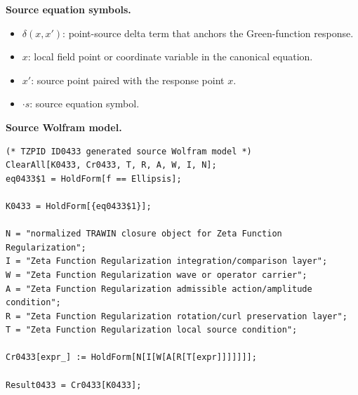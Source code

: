 \begin{minipage}[t]{0.49\linewidth}
\begingroup
\small
\raggedright
\textbf{Source equation symbols.}\par
\begin{itemize}[leftmargin=1.35em,itemsep=1pt,topsep=1pt,parsep=0pt]
    \item $\delta(x,x')$: point-source delta term that anchors the Green-function response.
    \item $x$: local field point or coordinate variable in the canonical equation.
    \item $x'$: source point paired with the response point $x$.
    \item $\cdot s$: source equation symbol.
\end{itemize}
\endgroup
\end{minipage}\hfill
\begin{minipage}[t]{0.47\linewidth}
\begingroup
\scriptsize
\raggedright
\textbf{Source Wolfram model.}\par
\begin{Verbatim}[fontsize=\tiny,breaklines=true,breakanywhere=true]
(* TZPID ID0433 generated source Wolfram model *)
ClearAll[K0433, Cr0433, T, R, A, W, I, N];
eq0433$1 = HoldForm[f == Ellipsis];

K0433 = HoldForm[{eq0433$1}];

N = "normalized TRAWIN closure object for Zeta Function Regularization";
I = "Zeta Function Regularization integration/comparison layer";
W = "Zeta Function Regularization wave or operator carrier";
A = "Zeta Function Regularization admissible action/amplitude condition";
R = "Zeta Function Regularization rotation/curl preservation layer";
T = "Zeta Function Regularization local source condition";

Cr0433[expr_] := HoldForm[N[I[W[A[R[T[expr]]]]]]];

Result0433 = Cr0433[K0433];
\end{Verbatim}
\endgroup
\end{minipage}

